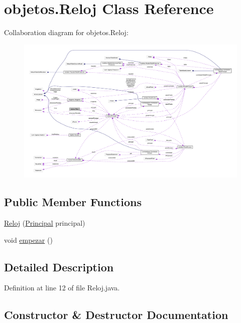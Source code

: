 \hypertarget{classobjetos_1_1_reloj}{}\section{objetos.\+Reloj Class Reference}
\label{classobjetos_1_1_reloj}


Collaboration diagram for objetos.\+Reloj\+:
\nopagebreak
\begin{figure}[H]
\begin{center}
\leavevmode
\includegraphics[width=350pt]{classobjetos_1_1_reloj__coll__graph}
\end{center}
\end{figure}
\subsection*{Public Member Functions}
\begin{DoxyCompactItemize}
\item 
\mbox{\hyperlink{classobjetos_1_1_reloj_aa15ad3d750972a2e0778c54b07847b1a}{Reloj}} (\mbox{\hyperlink{classvistas_1_1_principal}{Principal}} principal)
\item 
void \mbox{\hyperlink{classobjetos_1_1_reloj_a8568b99d4457c01294d2078b033330a4}{empezar}} ()
\end{DoxyCompactItemize}


\subsection{Detailed Description}


Definition at line 12 of file Reloj.\+java.



\subsection{Constructor \& Destructor Documentation}
\mbox{\label{classobjetos_1_1_reloj_aa15ad3d750972a2e0778c54b07847b1a}} 

